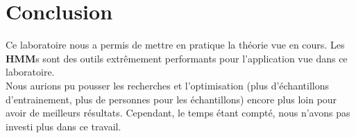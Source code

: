 
\chapter{Conclusion} %

\label{Conclusion} %



Ce laboratoire nous a permis de mettre en pratique la théorie vue en cours. Les \textbf{HMM}s sont des outils extrêmement performants pour l'application vue dans ce laboratoire. \\

Nous aurions pu pousser les recherches et l'optimisation (plus d'échantillons d'entrainement, plus de personnes pour les échantillons) encore plus loin pour avoir de meilleurs résultats. Cependant, le temps étant compté, nous n'avons pas investi plus dans ce travail. 